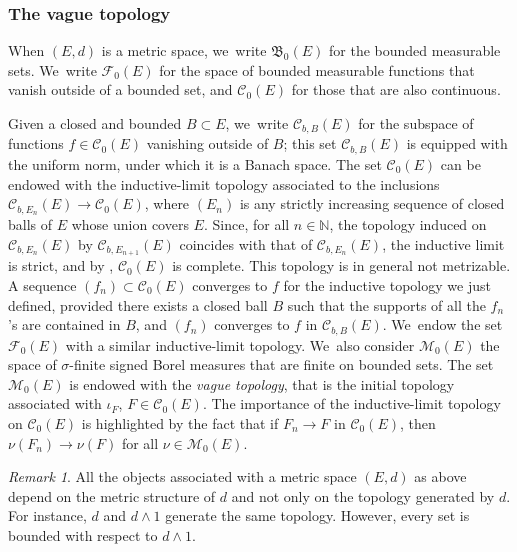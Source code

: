\documentclass[JEP,XML,SOM,Unicode,published]{cedram}
\theoremstyle{definition}
\theoremstyle{remark}
\newtheorem{remark}[theorem]{Remark}
\begin{document}
\subsubsection{The vague topology}

When $(E,d)$ is a metric space, we~write $\mathfrak{B}_{0}(E)$ for the bounded measurable sets. We~write $\mathscr{F}_{0}(E)$ for the space of bounded measurable functions that vanish outside of a bounded set, and $\mathscr{C}_{0}(E)$ for those that are also continuous.

Given a closed and bounded $B \subset E$, we~write $\mathscr{C}_{b,B}(E)$ for the subspace of functions $f \in \mathscr{C}_{0}(E)$ vanishing outside of $B$; this set $\mathscr{C}_{b,B}(E)$ is equipped with the uniform norm, under which it is a Banach space.
The set $\mathscr{C}_{0}(E)$ can be endowed with the inductive-limit topology associated to the inclusions $\mathscr{C}_{b,E_{n}}(E) \to \mathscr{C}_{0}(E)$, where $(E_{n})$ is any strictly increasing sequence of closed balls of $E$ whose union covers $E$.
Since, for all $n \in \mathbb{N}$, the topology induced on $\mathscr{C}_{b,E_{n}}(E)$ by $\mathscr{C}_{b,E_{n+1}}(E)$ coincides with that of $\mathscr{C}_{b,E_{n}}(E)$, the inductive limit is strict, and by \cite[Prop.\,9(iii), p.\,II.35]{BourbakiEVT}, $\mathscr{C}_{0}(E)$ is complete.
This topology is in general not metrizable.
A sequence $(f_{n}) \subset \mathscr{C}_{0}(E)$ converges to $f$ for the inductive topology we just defined, provided there exists a closed ball $B$ such that the supports of all the $f_{n}$'s are contained in $B$, and $(f_{n})$ converges to $f$ in $\mathscr{C}_{b,B}(E)$. We~endow the set $\mathscr{F}_{0}(E)$ with a similar inductive-limit topology. We~also consider $\mathscr{M}_{0}(E)$ the space of $\sigma$-finite signed Borel measures that are finite on bounded sets.
The set $\mathscr{M}_{0}(E)$ is endowed with the \emph{vague topology}, that is the initial topology associated with $\iota_{F}$, $F \in \mathscr{C}_{0}(E)$.
The importance of the inductive-limit topology on $\mathscr{C}_{0}(E)$ is highlighted by the fact that if $F_{n} \to F$ in $\mathscr{C}_{0}(E)$, then $\nu(F_{n}) \to \nu(F)$ for all $\nu \in \mathscr{M}_{0}(E)$.
\begin{remark}
All the objects associated with a metric space $(E,d)$ as above depend on the metric structure of $d$ and not only on the topology generated by $d$.
For instance, $d$ and $d \wedge 1$ generate the same topology.
However, every set is bounded with respect to $d \wedge 1$.
\end{remark}
\end{document}
